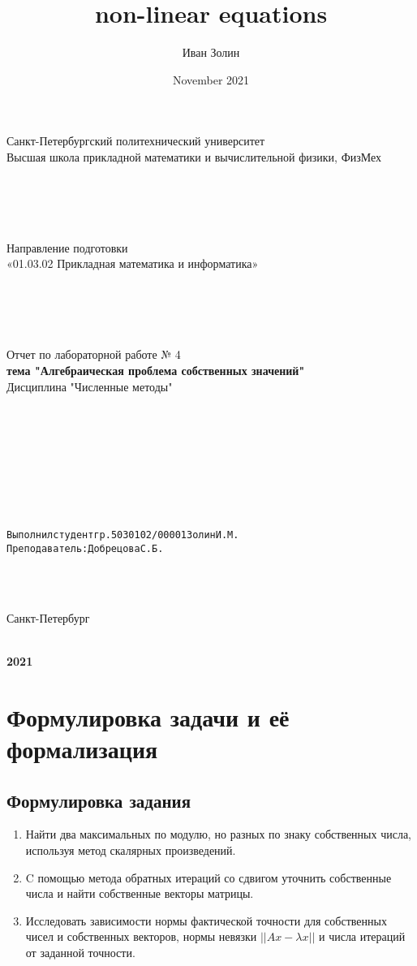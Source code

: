 \documentclass{article}
\title{non-linear equations}
\author{Иван Золин}
\date{November 2021}
\begin{document}
	
	\large
	\begin{center}
		
		Санкт-Петербургский политехнический университет\\
		Высшая школа прикладной математики и вычислительной физики, ФизМех
		
		~\\
		~\\
		~\\
		~\\
		Направление подготовки\\
		«01.03.02 Прикладная математика и информатика»
		
		~\\
		~\\
		~\\
		~\\
		Отчет по лабораторной работе № 4\\
		\textbf{тема "Алгебраическая проблема собственных значений" }	
		~\\	Дисциплина "Численные методы"
	\end{center}
	
	~\\
	~\\
	~\\
	~\\
	~\\
	~\\
	~\\
	\begin{alltt}
		Выполнил студент гр. 5030102/00001			  		   		  Золин И.М.
		Преподаватель: 				              	        	Добрецова С.Б.
	\end{alltt}
	
	~\\
	~\\
	\begin{center}
		Санкт-Петербург
		
		~\\
		\textbf{2021}
	\end{center}{}
	
	\newpage
	
	\section{Формулировка задачи и её формализация}
	\subsection{Формулировка задания}
	\begin{enumerate}
		\item Найти два максимальных по модулю, но разных по знаку собственных числа, используя метод скалярных произведений.
		\item C помощью метода обратных итераций со сдвигом уточнить
		собственные числа и найти собственные векторы матрицы.
		\item Исследовать зависимости нормы фактической точности для
		собственных чисел и собственных векторов, нормы невязки $||Ax - \lambda x||$
		и числа итераций от заданной точности.
	\end{enumerate}
\end{document}
